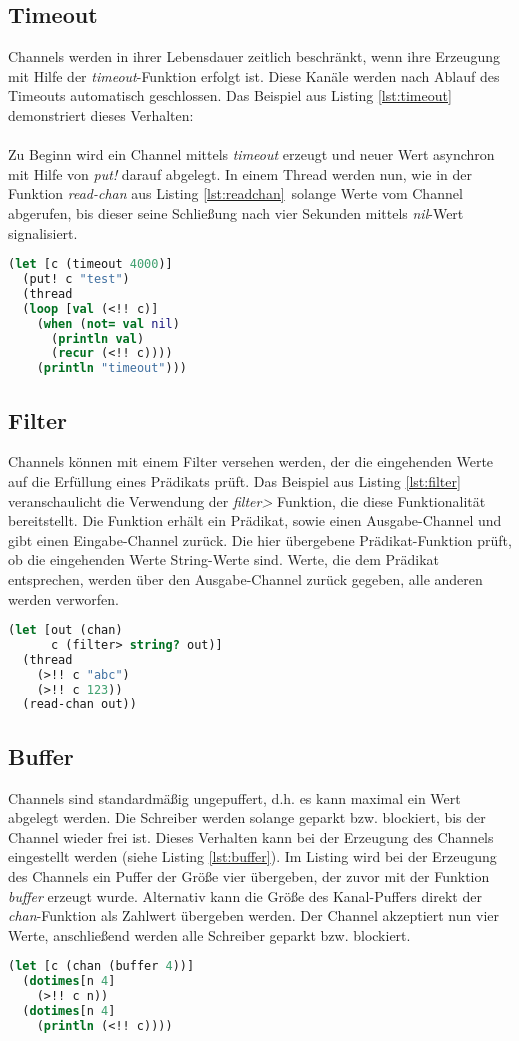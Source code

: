 \subsection{Timeout}
Channels werden in ihrer Lebensdauer zeitlich beschränkt, wenn ihre Erzeugung mit Hilfe der \textit{timeout}-Funktion erfolgt ist. Diese Kanäle werden nach Ablauf des Timeouts automatisch geschlossen. Das Beispiel aus Listing \ref{lst:timeout} demonstriert dieses Verhalten:\\
\\
Zu Beginn wird ein Channel mittels \textit{timeout} erzeugt und neuer Wert asynchron mit Hilfe von \textit{put!} darauf abgelegt. In einem Thread werden nun, wie in der Funktion \textit{read-chan} aus Listing \ref{lst:readchan}\ solange Werte vom Channel abgerufen, bis dieser seine Schließung nach vier Sekunden mittels \textit{nil}-Wert signalisiert.
\begin{lstlisting}[language=Clojure,caption=Timeout,label=lst:timeout]
(let [c (timeout 4000)]
  (put! c "test")
  (thread
  (loop [val (<!! c)]
    (when (not= val nil)
      (println val)
      (recur (<!! c))))
    (println "timeout")))
\end{lstlisting}
\subsection{Filter}
Channels können mit einem Filter versehen werden, der die eingehenden Werte auf die Erfüllung eines Prädikats prüft. Das Beispiel aus Listing \ref{lst:filter} veranschaulicht die Verwendung der \textit{filter>} Funktion, die diese Funktionalität bereitstellt. Die Funktion erhält ein Prädikat, sowie einen Ausgabe-Channel und gibt einen Eingabe-Channel zurück. Die hier übergebene Prädikat-Funktion prüft, ob die eingehenden Werte String-Werte sind. Werte, die dem Prädikat entsprechen, werden über den Ausgabe-Channel zurück gegeben, alle anderen werden verworfen.
\begin{lstlisting}[language=Clojure,caption=Filter,label=lst:filter]
(let [out (chan)
      c (filter> string? out)]
  (thread
    (>!! c "abc")
    (>!! c 123))
  (read-chan out))
\end{lstlisting}
\subsection{Buffer}
Channels sind standardmäßig ungepuffert, d.h. es kann maximal ein Wert abgelegt werden. Die Schreiber werden solange geparkt bzw. blockiert, bis der Channel wieder frei ist. Dieses Verhalten kann bei der Erzeugung des Channels eingestellt werden (siehe Listing \ref{lst:buffer}). Im Listing wird bei der Erzeugung des Channels ein Puffer der Größe vier übergeben, der zuvor mit der Funktion \textit{buffer} erzeugt wurde. Alternativ kann die Größe des Kanal-Puffers direkt der \textit{chan}-Funktion als Zahlwert übergeben werden. Der Channel akzeptiert nun vier Werte, anschließend werden alle Schreiber geparkt bzw. blockiert.
\begin{lstlisting}[language=Clojure,caption=Buffer,label=lst:buffer]
(let [c (chan (buffer 4))]
  (dotimes[n 4]
    (>!! c n))
  (dotimes[n 4]
    (println (<!! c))))
\end{lstlisting}
\acresetall
